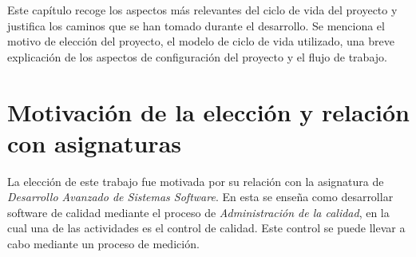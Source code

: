 


Este capítulo recoge los aspectos más relevantes del ciclo de vida del proyecto y justifica los caminos que se han tomado durante el desarrollo. Se menciona el motivo de elección del proyecto, el modelo de ciclo de vida utilizado, una breve explicación de los aspectos de configuración del proyecto y el flujo de trabajo.

\section{Motivación de la elección y relación con asignaturas}

La elección de este trabajo fue motivada por su relación con la asignatura de \textit{Desarrollo Avanzado de Sistemas Software}. En esta se enseña como desarrollar software de calidad mediante el proceso de \textit{Administración de la calidad}, en la cual una de las actividades es el control de calidad. Este control se puede llevar a cabo mediante un proceso de medición. 

